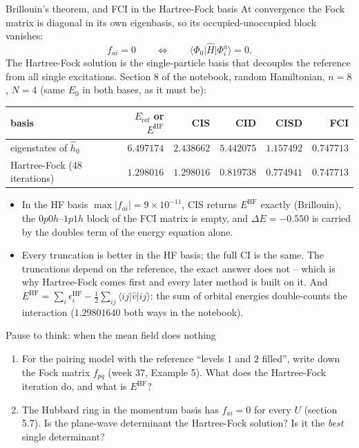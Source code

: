 \documentclass[aspectratio=169,10pt]{beamer}
\newcounter{thinkctr}
\newcommand{\thinkq}[2]{%
  \stepcounter{thinkctr}%
  \begin{tcolorbox}[colback=palewarm,colframe=warm,title={\bfseries Pause to think \#\thethinkctr\hfill\mdseries\small(about #1 min -- discuss with your neighbour)},fonttitle=\bfseries]
  #2
  \end{tcolorbox}}
\newcommand{\ket}[1]{\vert #1\rangle}
\newcommand{\bra}[1]{\langle #1\vert}
\newcommand{\element}[3]{\langle #1\vert #2\vert #3\rangle}
\begin{document}
\begin{frame}{Brillouin's theorem, and FCI in the Hartree-Fock basis}
  \footnotesize
  At convergence the Fock matrix is diagonal in its own eigenbasis, so its occupied-unoccupied block vanishes:
  \[
    f_{ai}=0\qquad\Longleftrightarrow\qquad\bra{\Phi_0}\hat{H}\ket{\Phi_i^a}=0 .
  \]
  The Hartree-Fock solution is \alert{the single-particle basis that decouples the reference from all single excitations}. Section 8 of the notebook, random Hamiltonian, $n=8$, $N=4$ (same $E_0$ in both bases, as it must be):
  \begin{center}\footnotesize
  \renewcommand{\arraystretch}{1.15}
  \begin{tabular}{lrrrrr}
    \toprule
    basis & $E_{\mathrm{ref}}$ or $E^{\mathrm{HF}}$ & CIS & CID & CISD & FCI\\
    \midrule
    eigenstates of $\hat{h}_0$ & $6.497174$ & $2.438662$ & $5.442075$ & $1.157492$ & $0.747713$\\
    Hartree-Fock ($48$ iterations) & $1.298016$ & $1.298016$ & $0.819738$ & $0.774941$ & $0.747713$\\
    \bottomrule
  \end{tabular}
  \end{center}
  \begin{itemize}
    \item In the HF basis $\max|f_{ai}|=9\times10^{-11}$, CIS returns $E^{\mathrm{HF}}$ exactly (Brillouin), the $0p0h$--$1p1h$ block of the FCI matrix is empty, and $\Delta E=-0.550$ is carried by the doubles term of the energy equation alone.
    \item Every truncation is better in the HF basis; the full CI is the same. \alert{The truncations depend on the reference, the exact answer does not} -- which is why Hartree-Fock comes first and every later method is built on it. And $E^{\mathrm{HF}}=\sum_i\epsilon_i^{\mathrm{HF}}-\frac12\sum_{ij}\element{ij}{\hat{v}}{ij}$: the sum of orbital energies double-counts the interaction ($1.29801640$ both ways in the notebook).
  \end{itemize}
\end{frame}

\begin{frame}{Pause to think: when the mean field does nothing}
  \thinkq{3}{
  \begin{enumerate}
    \item For the pairing model with the reference ``levels $1$ and $2$ filled'', write down the Fock matrix $f_{pq}$ (week 37, Example 5). What does the Hartree-Fock iteration do, and what is $E^{\mathrm{HF}}$?
    \item The Hubbard ring in the momentum basis has $f_{ai}=0$ for every $U$ (section 5.7). Is the plane-wave determinant the Hartree-Fock solution? Is it the \emph{best} single determinant?
  \end{enumerate}}
\end{frame}
\end{document}

